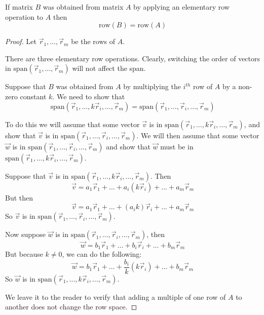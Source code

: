 \documentclass{ximera}
\begin{document}
\begin{theorem}\label{th:rowBrowA} If matrix $B$ was obtained from matrix $A$ by applying an elementary row operation to $A$ then
$$\mbox{row}(B)=\mbox{row}(A)$$
\end{theorem}
\begin{proof}
Let $\vec{r}_1,\ldots ,\vec{r}_m$ be the rows of $A$. 

There are three elementary row operations.  Clearly, switching the order of vectors in $\mbox{span}(\vec{r}_1,\ldots  ,\vec{r}_m)$ will not affect the span.  

Suppose that $B$ was obtained from $A$ by multiplying the $i^{th}$ row of $A$ by a non-zero constant $k$.  We need to show that 
$$\mbox{span}(\vec{r}_1,\ldots ,k\vec{r}_i,\ldots ,\vec{r}_m)=\mbox{span}(\vec{r}_1,\ldots ,\vec{r}_i,\ldots ,\vec{r}_m)$$

To do this we will assume that some vector $\vec{v}$ is in $\mbox{span}(\vec{r}_1,\ldots ,k\vec{r}_i,\ldots ,\vec{r}_m)$, and show that $\vec{v}$ is in $\mbox{span}(\vec{r}_1,\ldots ,\vec{r}_i,\ldots ,\vec{r}_m)$.  We will then assume that some vector $\vec{w}$ is in $\mbox{span}(\vec{r}_1,\ldots ,\vec{r}_i,\ldots ,\vec{r}_m)$ and show that $\vec{w}$ must be in $\mbox{span}(\vec{r}_1,\ldots ,k\vec{r}_i,\ldots ,\vec{r}_m)$.

Suppose that $\vec{v}$ is in $\mbox{span}(\vec{r}_1,\ldots ,k\vec{r}_i,\ldots ,\vec{r}_m)$.  Then 
$$\vec{v}=a_1\vec{r}_1+\ldots +a_i(k\vec{r}_i)+\ldots +a_m\vec{r}_m$$
But then 
$$\vec{v}=a_1\vec{r}_1+\ldots +(a_ik)\vec{r}_i+\ldots +a_m\vec{r}_m$$
So $\vec{v}$ is in $\mbox{span}(\vec{r}_1,\ldots ,\vec{r}_i,\ldots ,\vec{r}_m)$.

Now suppose $\vec{w}$ is in $\mbox{span}(\vec{r}_1,\ldots ,\vec{r}_i,\ldots ,\vec{r}_m)$, then
$$\vec{w}=b_1\vec{r}_1+\ldots +b_i\vec{r}_i+\ldots +b_m\vec{r}_m$$
But because $k\neq 0$, we can do the following:
$$\vec{w}=b_1\vec{r}_1+\ldots +\frac{b_i}{k}(k\vec{r}_i)+\ldots +b_m\vec{r}_m$$
So $\vec{w}$ is in $\mbox{span}(\vec{r}_1,\ldots ,k\vec{r}_i,\ldots ,\vec{r}_m)$.
  
We leave it to the reader to verify that adding a multiple of one row of $A$ to another does not change the row space.  %
  

\end{proof}
\end{document}
